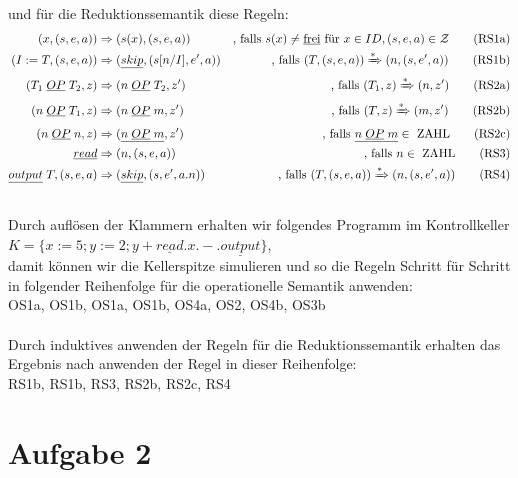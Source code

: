 \documentclass[ngerman,a4paper]{report}
\begin{document}
und für die Reduktionssemantik diese Regeln:
\begin{align}
(x,(s,e,a)) &\Rightarrow (s(x), (s,e,a))&\text{, falls }s(x) \neq \text{\underline{frei}}\text{ für }x \in ID, (s,e,a) \in \mathcal{Z}\tag{RS1a}\\
(I:=T,(s,e,a)) &\Rightarrow (\underline{skip}, (s[n/I],e',a))&\text{, falls }(T, (s,e,a))\xRightarrow{*}(n,(s,e',a))\tag{RS1b}\\
(T_1\;\underline{OP}\;T_2, z) &\Rightarrow (n\;\underline{OP}\;T_2, z')&\text{, falls }(T_1, z) \xRightarrow{*}(n,z')\tag{RS2a}\\
(n\;\underline{OP}\;T_1, z) &\Rightarrow (n\;\underline{OP}\;m, z')&\text{, falls }(T, z) \xRightarrow{*}(m,z')\tag{RS2b}\\
(n\;\underline{OP}\;n, z) &\Rightarrow (\underline{n\;\underline{OP}\;m}, z')&\text{, falls }\underline{n\;\underline{OP}\;m} \in\text{ ZAHL}\tag{RS2c}\\
\underline{read} &\Rightarrow (n, (s,e,a))&\text{, falls } n \in\text{ ZAHL}\tag{RS3}\\
\underline{output}\;T, (s,e,a) &\Rightarrow (\underline{skip}, (s,e',a.n))&\text{, falls }(T, (s,e,a))\xRightarrow{*}(n,(s,e',a))\tag{RS4}\\\notag
\end{align}
Durch auflösen der Klammern erhalten wir folgendes Programm im Kontrollkeller\\
$K= \{x := 5; y := 2; y + \underline{read}.x.-.\underline{output}\}$,\\ damit können wir die Kellerspitze simulieren und so die Regeln Schritt für Schritt in folgender Reihenfolge für die operationelle Semantik anwenden:\\
OS1a, OS1b, OS1a, OS1b, OS4a, OS2, OS4b, OS3b\\
\\
Durch induktives anwenden der Regeln für die Reduktionssemantik erhalten das Ergebnis nach anwenden der Regel in dieser Reihenfolge:\\
RS1b, RS1b, RS3, RS2b, RS2c, RS4\\

\section*{Aufgabe 2}
\end{document}
